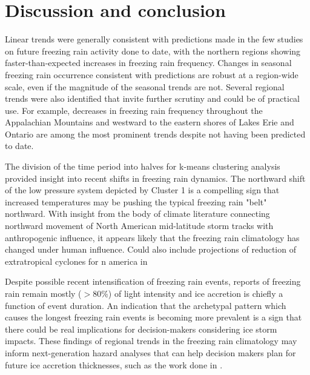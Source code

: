 \documentclass[twocol]{ametsoc}
\begin{document}
\section{Discussion and conclusion}
Linear trends were generally consistent with predictions made in the few studies on future freezing rain activity done to date, with the northern regions showing faster-than-expected increases in freezing rain frequency. Changes in seasonal freezing rain occurrence consistent with predictions are robust at a region-wide scale, even if the magnitude of the seasonal trends are not. Several regional trends were also identified that invite further scrutiny and could be of practical use. For example, decreases in freezing rain frequency throughout the Appalachian Mountains and westward to the eastern shores of Lakes Erie and Ontario are among the most prominent trends despite not having been predicted to date. 

The division of the time period into halves for k-means clustering analysis provided insight into recent shifts in freezing rain dynamics. The northward shift of the low pressure system depicted by Cluster 1 is a compelling sign that increased temperatures may be pushing the typical freezing rain "belt" northward. With insight from the body of climate literature connecting northward movement of North American mid-latitude storm tracks with anthropogenic influence, it appears likely that the freezing rain climatology has changed under human influence.  Could also include projections of reduction of extratropical cyclones for n america in \citet{chang2013cmip5}

Despite possible recent intensification of freezing rain events, reports of freezing rain remain mostly ($>$80\%) of light intensity and ice accretion is chiefly a function of event duration. An indication that the archetypal pattern which causes the longest freezing rain events is becoming more prevalent is a sign that there could be real implications for decision-makers considering ice storm impacts. These findings of regional trends in the freezing rain climatology may inform next-generation hazard analyses that can help decision makers plan for future ice accretion thicknesses, such as the work done in \citet{erfani2014aggregated}.
\end{document}
